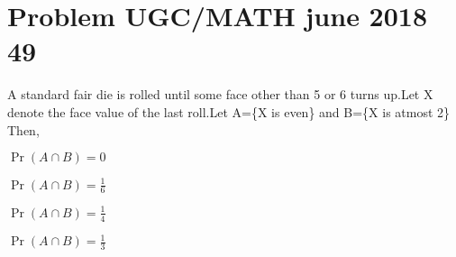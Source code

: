 \documentclass[journal,12pt,twocolumn]{IEEEtran}
\begin{document}
\section{Problem UGC/MATH june 2018 49}
A standard fair die is rolled until some face other than 5 or 6 turns up.Let X denote the face value of the last roll.Let A=\{X is even\} and B=\{X is atmost 2\}
Then,
\begin{enumerate}[(A)]
\begin{multicols}{2}
\setlength\itemsep{1em}
\item $\Pr{(A\cap {B})}=0$\\
\item $\Pr{(A \cap B)}=\frac{1}{6}$\\
\item $\Pr{(A\cap B)}=\frac{1}{4}$\\
\item $\Pr{({A} \cap {B})}=\frac{1}{3}$
\end{multicols}
\end{enumerate}
\end{document}
